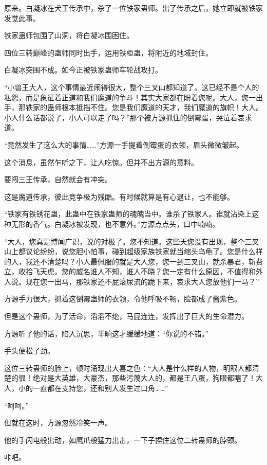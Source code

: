 \begin{this_body}
原来。白凝冰在犬王传承中，杀了一位铁家蛊师。出了传承之后，她立即就被铁家发觉此事。

铁家蛊师包围了山洞，将白凝冰围困住。

四位三转巅峰的蛊师同时出手，运用铁柜蛊，将附近的地域封住。

白凝冰突围不成。如今正被铁家蛊师车轮战攻打。

“小兽王大人，这个事情最近闹得很大，整个三叉山都知道了。这已经不是个人的私怨，而是象征着正道和我们魔道的争斗！其实大家都在盼着您呢。大人，您一出手，那铁家的蛊师根本抵挡不住。您是我们魔道的天才，我们魔道的旗帜！大人。小人什么话都说了，小人可以走了吗？”那个被方源抓住的倒霉蛋，哭泣着哀求道。

“竟然发生了这么大的事情……”方源一手提着倒霉蛋的衣领，眉头微微皱起。

这个消息，虽然乍听之下，让人吃惊。但并不出方源的意料。

要闯三王传承，自然就会有冲突。

这是魔道传承，彼此竞争极为残酷。有时候就算是有心退让，也不能够。

“铁家有铁锈花蛊，此蛊中在铁家蛊师的魂魄当中。谁杀了铁家人。谁就沾染上这种无形的香气。白凝冰被发现，也不意外。”方源点点头，口中喃喃。

“大人，您真是博闻广识，说的对极了。您不知道。这些天您没有出现，整个三叉山上都议论纷纷，说您胆小怕事，碰到超级家族铁家就当缩头乌龟了。您是什么样的人，我还不清楚吗？小人最佩服的就是大人您，您一到三叉山，就杀暴君，斩费立，收拾飞天虎。您的威名谁人不知，谁人不晓？您一定有什么原因，不值得和外人说。现在您一出马，那铁家还不屁滚尿流的跪下来，哀求大人您放他们一马？”

方源手力很大，抓着这倒霉蛊师的衣领，令他呼吸不畅，脸都成了酱紫色。

但是这个蛊师，为了活命，滔滔不绝，马屁连连，发挥出了巨大的生命潜力。

方源听了他的话，陷入沉思，半晌这才缓缓地道：“你说的不错。”

手头便松了劲。

这位三转蛊师的脸上，顿时涌现出大喜之色：“大人是什么样的人物，明眼人都清楚的很！绝对是大英雄，大豪杰，那些污蔑大人的，都是王八蛋，狗眼都瞎了！大人，小的一直都在支持您，还和别人发生过口角……”

“呵呵。”

但就在这时，方源忽然冷笑一声。

他的手闪电般出动，如鹰爪般猛力出击，一下子捏住这位二转蛊师的脖颈。

咔吧。


\end{this_body}
